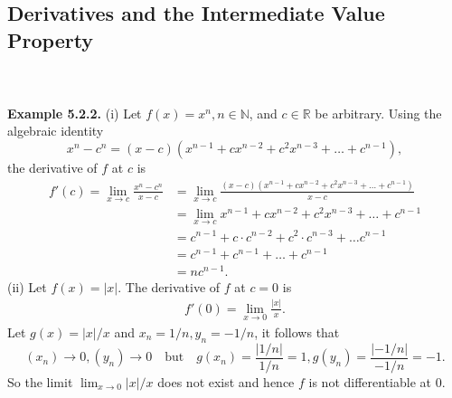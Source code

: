 \documentclass{article}
\begin{document}
            \subsection{Derivatives and the Intermediate Value Property}
            \\ \\
            \textbf{Example 5.2.2.} (i) Let $f(x)=x^n, n \in \mathbb{N}$, and $c \in \mathbb{R}$ be arbitrary. Using the algebraic identity
            \begin{equation*}
                x^n-c^n = (x-c)(x^{n-1}+cx^{n-2}+c^2x^{n-3}+\dots+c^{n-1}),
            \end{equation*}
            the derivative of $f$ at $c$ is
            \begin{align*}
                f'(c) = \lim_{x\to c} \frac{x^n - c^n}{x-c} & = \lim_{x \to c} \frac{(x-c)(x^{n-1}+cx^{n-2}+c^2x^{n-3}+\dots+c^{n-1})}{x-c} \\
                & = \lim_{x \to c} x^{n-1}+cx^{n-2}+c^2x^{n-3}+\dots+c^{n-1} \\
                & = c^{n-1}+c\cdot c^{n-2}+c^2\cdot c^{n-3} + \dots c^{n-1} \\
                & = c^{n-1}+c^{n-1}+\dots+c^{n-1} \\
                & = nc^{n-1}.
            \end{align*}
            (ii) Let $f(x) = |x|$. The derivative of $f$ at $c=0$ is
            \begin{align*}
                f'(0) = \lim_{x \to 0} \frac{|x|}{x}.
            \end{align*}
            Let $g(x)=|x|/x$ and $x_n=1/n,y_n=-1/n$, it follows that
            \begin{equation*}
                (x_n) \to 0, (y_n) \to 0 \quad \text{but} \quad g(x_n) = \frac{|1/n|}{1/n} = 1, g(y_n) = \frac{|-1/n|}{-1/n} = -1.
            \end{equation*}
            So the limit $\lim_{x \to 0}|x|/x$ does not exist and hence $f$ is not differentiable at 0.
\end{document}
